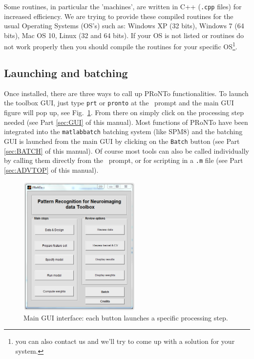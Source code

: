 Some routines, in particular the 'machines', are written in C++ ({\tt .cpp} files) for increased efficiency. We are trying to provide these compiled routines for the usual Operating Systems (OS's) such as: Windows XP (32 bits), Windows 7 (64 bits), Mac OS 10, Linux (32 and 64 bits). If your OS is not listed or routines do not work properly then you should compile the routines for your specific OS\footnote{you can also contact us and we'll try to come up with a solution for your system.}. 

\subsection{Launching and batching}

Once installed, there are three ways to call up PRoNTo functionalities.
To launch the toolbox GUI, just type {\tt prt} or {\tt pronto} at the \matlab \ prompt and the main GUI figure will pop up, see Fig.~\ref{fig:mainGUI}. From there on simply click on the processing step needed (see Part \ref{sec:GUI} of this manual). Most functions of PRoNTo have been integrated into the {\tt matlabbatch} batching system \cite{matlabbatch} (like SPM8) and the batching GUI is launched from the main GUI by clicking on the {\tt Batch} button  (see Part \ref{sec:BATCH} of this manual).
Of course most tools can also be called individually by calling them directly from the \matlab \ prompt, or for scripting in a {\tt .m} file  (see Part \ref{sec:ADVTOP} of this manual).

\begin{figure}[!htbp]
  \begin{center}
      \includegraphics[height=7cm]{images/fig2_main_prt.png}
   \caption{Main GUI interface: each button launches a specific processing step.}
    \label{fig:mainGUI}
  \end{center}
\end{figure}	

